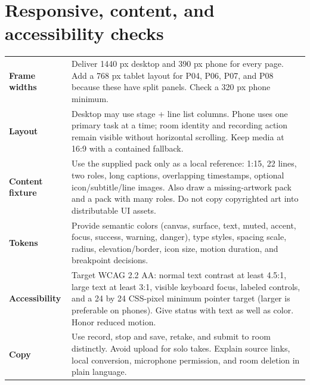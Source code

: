 \documentclass[10pt,a4paper]{article}
\begin{document}
\section{Responsive, content, and accessibility checks}
\begin{tabularx}{\linewidth}{@{}>{\bfseries\color{teal}}p{35mm}X@{}}
Frame widths & Deliver 1440 px desktop and 390 px phone for every page. Add a 768 px tablet layout for P04, P06, P07, and P08 because these have split panels. Check a 320 px phone minimum.\\
Layout & Desktop may use stage + line list columns. Phone uses one primary task at a time; room identity and recording action remain visible without horizontal scrolling. Keep media at 16:9 with a contained fallback.\\
Content fixture & Use the supplied pack only as a local reference: 1:15, 22 lines, two roles, long captions, overlapping timestamps, optional icon/subtitle/line images. Also draw a missing-artwork pack and a pack with many roles. Do not copy copyrighted art into distributable UI assets.\\
Tokens & Provide semantic colors (canvas, surface, text, muted, accent, focus, success, warning, danger), type styles, spacing scale, radius, elevation/border, icon size, motion duration, and breakpoint decisions.\\
Accessibility & Target WCAG 2.2 AA: normal text contrast at least 4.5:1, large text at least 3:1, visible keyboard focus, labeled controls, and a 24 by 24 CSS-pixel minimum pointer target (larger is preferable on phones). Give status with text as well as color. Honor reduced motion.\\
Copy & Use record, stop and save, retake, and submit to room distinctly. Avoid upload for solo takes. Explain source links, local conversion, microphone permission, and room deletion in plain language.\\
\end{tabularx}

\clearpage
\end{document}
